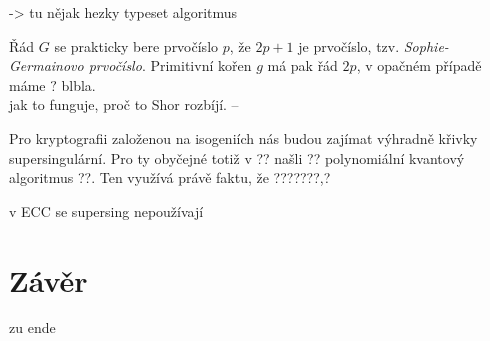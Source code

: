 \documentclass [12pt]{report}
\begin{document}
-> tu nějak hezky typeset algoritmus

Řád $G$ se prakticky bere prvočíslo $p$, že $2p+1$ je prvočíslo, tzv. \textit{Sophie-Germainovo prvočíslo}. Primitivní kořen $g$ má pak řád $2p$, v opačném případě máme $?$ blbla.\\



jak to funguje, proč to Shor rozbíjí.
--

Pro kryptografii založenou na isogeniích nás budou zajímat výhradně křivky supersingulární. Pro ty obyčejné totiž v ?? našli ?? polynomiální kvantový algoritmus ??. Ten využívá právě faktu, že ???????,?

\begin{poznamka}
v ECC se supersing nepoužívají
\end{poznamka}

\chapter*{Závěr}
zu ende
\end{document}
